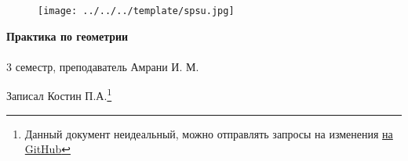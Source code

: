 \documentclass[main]{subfiles}
\begin{document}
	\begin{figure}[H]
			\texttt{[image: ../../../template/spsu.jpg]}
			\centering
	\end{figure}
	\vspace*{\fill}
	\begin{center}
		\huge \textbf{Практика по геометрии}\\ \ \\
		\Large 3 семестр, преподаватель Амрани И. М.

		\large Записал Костин П.А.\footnote{Данный документ неидеальный, можно отправлять запросы на изменения \href{https://github.com/KostinP/Mathematical-LecturesAndPractices}{на GitHub}}
	\end{center}
	\vspace*{\fill}
	\vspace*{\fill}

	\newpage
	\tableofcontents
	\newpage
\end{document}
